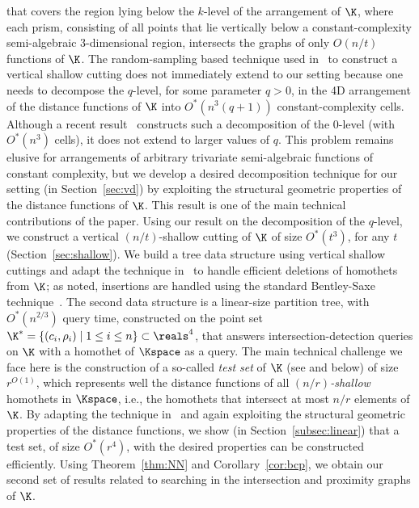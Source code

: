 that covers the region lying below the $k$-level of 
the arrangement of $\K$, where
each prism, consisting of all points that lie 
vertically below a constant-complexity semi-algebraic 
$3$-dimensional region, intersects the graphs of only $O(n/t)$ functions of $\K$.
The random-sampling based technique used in~\cite{Chan:le,KMRSS} to construct a vertical shallow cutting 
does not immediately extend to our setting because one 
needs to decompose the $q$-level, for some parameter $q>0$, in the 
4D arrangement of the distance functions of $\K$ 
into $O^*(n^3(q+1))$ constant-complexity cells. Although a recent 
result~\cite{AES:vd} constructs such a decomposition of the $0$-level (with $O^*(n^3)$ cells), it does not 
extend to larger values of $q$.
This problem remains elusive for arrangements of arbitrary trivariate semi-algebraic functions of constant complexity, 
but we develop a desired decomposition technique for our setting
(in Section~\ref{sec:vd}) by exploiting the 
structural geometric properties of the distance functions of $\K$. This result is one 
of the main technical contributions of the paper. Using our result on the decomposition of the $q$-level,
we construct a vertical $(n/t)$-shallow 
cutting of $\K$ of size $O^*(t^3)$, for any $t$ (Section~\ref{sec:shallow}). 
\iffullver
We build a tree data structure using vertical shallow cuttings
and adapt the technique in~\cite{AM95} to handle efficient deletions of 
homothets from $\K$; as noted, insertions are handled using the standard Bentley-Saxe technique~\cite{BS80}.
\fi
%
The second data structure is a linear-size partition tree, with $O^*(n^{2/3})$ query time,
constructed on the point set $\K^* = \{ (c_i, \rho_i) \mid 1 \le i \le n\} \subset\reals^4$,
that answers intersection-detection queries on $\K$ with a homothet of 
$\Kspace$ as a query. The main 
technical challenge we face here is the construction of a so-called \emph{test set} of $\K$ 
(see \cite{ShSh} and below) of size $r^{O(1)}$, which represents well the distance functions of all 
\emph{$(n/r)$-shallow} homothets in $\Kspace$, i.e., the homothets that intersect 
at most $n/r$ elements of $\K$. By adapting the technique in~\cite{ShSh} and again exploiting 
the structural geometric properties of the distance functions, we show 
\iffullver
(in Section~\ref{subsec:linear}) 
\fi
that a test set, of size $O^*(r^4)$, with the desired properties can be constructed efficiently.
%
\iffullver
Using Theorem~\ref{thm:NN} and Corollary~\ref{cor:bcp}, we obtain our second set of results 
related to searching in the intersection and proximity graphs of $\K$.
